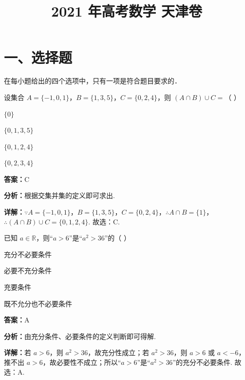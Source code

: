﻿\title{2021 年高考数学 天津卷}
\date{}
\maketitle

\section*{一、选择题}
在每小题给出的四个选项中，只有一项是符合题目要求的．

\begin{question}[points=5]
设集合 $A = \{-1,0,1\}$，$B = \{1,3,5\}$，$C = \{0,2,4\}$，则 $(A \cap B) \cup C =$（   ）
\begin{choices}
  \item $\{0\}$
  \item $\{0,1,3,5\}$
  \item $\{0,1,2,4\}$
  \item $\{0,2,3,4\}$
\end{choices}
\begin{solution}
\textbf{答案：}C

\textbf{分析：}根据交集并集的定义即可求出.

\textbf{详解：}$\because A = \{-1,0,1\}$，$B = \{1,3,5\}$，$C = \{0,2,4\}$，$\therefore A \cap B = \{1\}$，$\therefore (A \cap B) \cup C = \{0,1,2,4\}$. 故选：C.
\end{solution}
\end{question}

\begin{question}[points=5]
已知 $a \in \mathbb{R}$，则“$a > 6$”是“$a^2 > 36$”的（   ）
\begin{choices}
  \item 充分不必要条件
  \item 必要不充分条件
  \item 充要条件
  \item 既不允分也不必要条件
\end{choices}
\begin{solution}
\textbf{答案：}A

\textbf{分析：}由充分条件、必要条件的定义判断即可得解.

\textbf{详解：}若 $a > 6$，则 $a^2 > 36$，故充分性成立；若 $a^2 > 36$，则 $a > 6$ 或 $a < -6$，推不出 $a > 6$，故必要性不成立；所以“$a > 6$”是“$a^2 > 36$”的充分不必要条件. 故选：A.
\end{solution}
\end{question}

